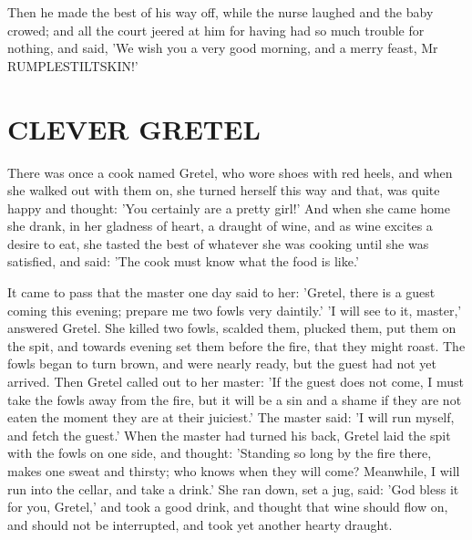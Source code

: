 \documentclass[12pt]{book}
\begin{document}
Then he made the best of his way off, while the nurse laughed and the
baby crowed; and all the court jeered at him for having had so much
trouble for nothing, and said, 'We wish you a very good morning, and a
merry feast, Mr RUMPLESTILTSKIN!'



\chapter{CLEVER GRETEL}

There was once a cook named Gretel, who wore shoes with red heels, and
when she walked out with them on, she turned herself this way and
that, was quite happy and thought: 'You certainly are a pretty girl!'
And when she came home she drank, in her gladness of heart, a draught
of wine, and as wine excites a desire to eat, she tasted the best of
whatever she was cooking until she was satisfied, and said: 'The cook
must know what the food is like.'

It came to pass that the master one day said to her: 'Gretel, there is
a guest coming this evening; prepare me two fowls very daintily.' 'I
will see to it, master,' answered Gretel. She killed two fowls,
scalded them, plucked them, put them on the spit, and towards evening
set them before the fire, that they might roast. The fowls began to
turn brown, and were nearly ready, but the guest had not yet arrived.
Then Gretel called out to her master: 'If the guest does not come, I
must take the fowls away from the fire, but it will be a sin and a
shame if they are not eaten the moment they are at their juiciest.'
The master said: 'I will run myself, and fetch the guest.' When the
master had turned his back, Gretel laid the spit with the fowls on one
side, and thought: 'Standing so long by the fire there, makes one
sweat and thirsty; who knows when they will come? Meanwhile, I will
run into the cellar, and take a drink.' She ran down, set a jug, said:
'God bless it for you, Gretel,' and took a good drink, and thought
that wine should flow on, and should not be interrupted, and took yet
another hearty draught.
\end{document}

